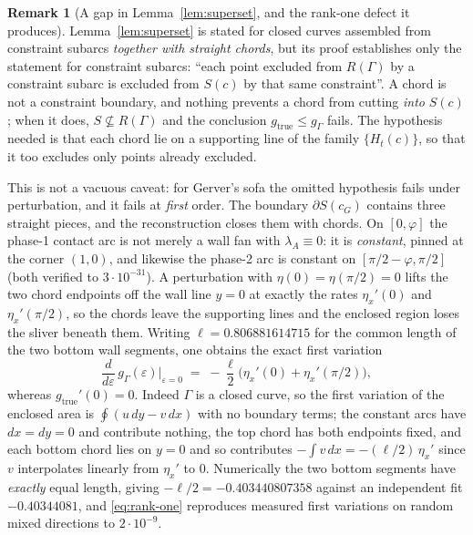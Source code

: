 \documentclass[11pt]{amsart}
\theoremstyle{plain}
\theoremstyle{definition}
\newtheorem{remark}[theorem]{Remark}
\newcommand{\cG}{c_{G}}
\begin{document}
\begin{remark}[A gap in Lemma~\ref{lem:superset}, and the rank-one defect it
produces]
\label{rem:chord-gap}
Lemma~\ref{lem:superset} is stated for closed curves assembled from
constraint subarcs \emph{together with straight chords}, but its proof
establishes only the statement for constraint subarcs: ``each point
excluded from $R(\Gamma)$ by a constraint subarc is excluded from
$S(c)$ by that same constraint''.  A chord is not a constraint
boundary, and nothing prevents a chord from cutting \emph{into}
$S(c)$; when it does, $S\not\subseteq R(\Gamma)$ and the conclusion
$g_{\mathrm{true}}\leq g_{\Gamma}$ fails.  The hypothesis needed is
that each chord lie on a supporting line of the family
$\{H_{t}(c)\}$, so that it too excludes only points already excluded.

This is not a vacuous caveat: for Gerver's sofa the omitted hypothesis
fails under perturbation, and it fails at \emph{first} order.  The
boundary $\partial S(\cG)$ contains three straight pieces, and the
reconstruction closes them with chords.  On $[0,\varphi]$ the phase-1
contact arc is not merely a wall fan with $\lambda_{A}\equiv0$: it is
\emph{constant}, pinned at the corner $(1,0)$, and likewise the
phase-2 arc is constant on $[\pi/2-\varphi,\pi/2]$ (both verified to
$3\cdot10^{-31}$).  A perturbation with
$\eta(0)=\eta(\pi/2)=0$ lifts the two chord endpoints off the wall
line $y=0$ at exactly the rates $\eta_{x}'(0)$ and
$\eta_{x}'(\pi/2)$, so the chords leave the supporting lines and the
enclosed region loses the sliver beneath them.  Writing
$\ell=0.806881614715$ for the common length of the two bottom wall
segments, one obtains the exact first variation
\begin{equation}\label{eq:rank-one}
   \frac{d}{d\varepsilon}\,g_{\Gamma}(\varepsilon)\Big|_{\varepsilon=0}
   \;=\; -\frac{\ell}{2}\bigl(\eta_{x}'(0)+\eta_{x}'(\pi/2)\bigr),
\end{equation}
whereas $g_{\mathrm{true}}'(0)=0$.  Indeed $\Gamma$ is a closed curve,
so the first variation of the enclosed area is
$\oint(u\,dy-v\,dx)$ with no boundary terms; the constant arcs have
$dx=dy=0$ and contribute nothing, the top chord has both endpoints
fixed, and each bottom chord lies on $y=0$ and so contributes
$-\int v\,dx=-(\ell/2)\,\eta_{x}'$ since $v$ interpolates linearly
from $\eta_{x}'$ to $0$.  Numerically the two bottom segments have
\emph{exactly} equal length, giving $-\ell/2=-0.403440807358$ against
an independent fit $-0.40344081$, and \eqref{eq:rank-one} reproduces
measured first variations on random mixed directions to
$2\cdot10^{-9}$.


\end{remark}
\end{document}
